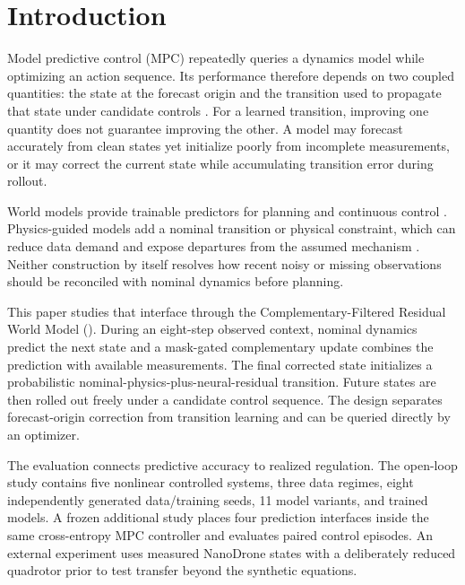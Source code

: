 \section{Introduction}

Model predictive control (MPC) repeatedly queries a dynamics model while
optimizing an action sequence. Its performance therefore depends on two
coupled quantities: the state at the forecast origin and the transition used
to propagate that state under candidate controls \cite{hewing2020_learning_mpc}.
For a learned transition, improving one quantity does not guarantee improving
the other. A model may forecast accurately from clean states yet initialize
poorly from incomplete measurements, or it may correct the current state while
accumulating transition error during rollout.

World models provide trainable predictors for planning and continuous control
\cite{hansen2023_td_mpc2_scalable_robust_world,hafner2025_mastering_diverse_control_tasks_through}.
Physics-guided models add a nominal transition or physical constraint, which
can reduce data demand and expose departures from the assumed mechanism
\cite{karniadakis2021_physics_informed_machine_learning,yu2024_learning_dynamical_systems_from_data}.
Neither construction by itself resolves how recent noisy or missing
observations should be reconciled with nominal dynamics before planning.

This paper studies that interface through the Complementary-Filtered Residual
World Model (\method). During an eight-step observed context, nominal dynamics
predict the next state and a mask-gated complementary update combines the
prediction with available measurements. The final corrected state initializes
a probabilistic nominal-physics-plus-neural-residual transition. Future states
are then rolled out freely under a candidate control sequence. The design
separates forecast-origin correction from transition learning and can be
queried directly by an optimizer.

The evaluation connects predictive accuracy to realized regulation. The
open-loop study contains five nonlinear controlled systems, three data regimes,
eight independently generated data/training seeds, 11 model variants, and
\ConfirmatoryRuns{} trained models. A frozen additional study places four
prediction interfaces inside the same cross-entropy MPC controller and
evaluates \ClosedLoopEpisodes{} paired control episodes. An external experiment
uses measured NanoDrone states \cite{busetto2026_nanodrone} with a deliberately
reduced quadrotor prior to test transfer beyond the synthetic equations.

